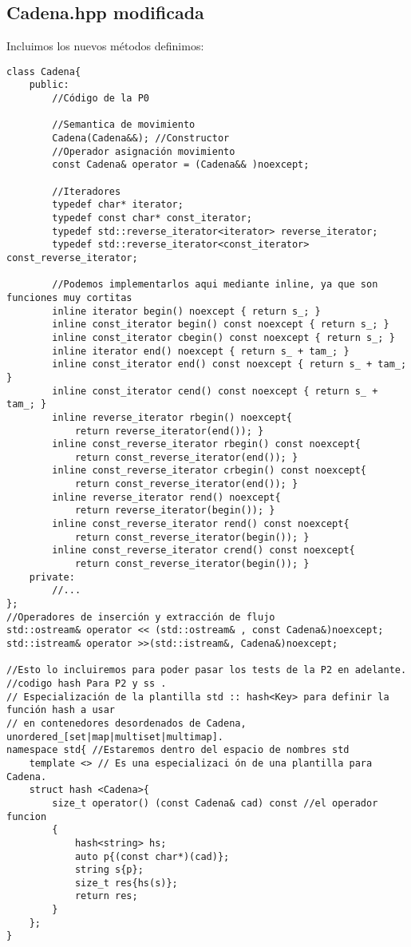 \subsection{Cadena.hpp modificada}
Incluimos los nuevos métodos definimos:
\begin{verbatim}
class Cadena{
    public:
        //Código de la P0

        //Semantica de movimiento
        Cadena(Cadena&&); //Constructor
        //Operador asignación movimiento
        const Cadena& operator = (Cadena&& )noexcept; 

        //Iteradores
        typedef char* iterator;
        typedef const char* const_iterator;
        typedef std::reverse_iterator<iterator> reverse_iterator;
        typedef std::reverse_iterator<const_iterator> const_reverse_iterator;

        //Podemos implementarlos aqui mediante inline, ya que son funciones muy cortitas
        inline iterator begin() noexcept { return s_; }
        inline const_iterator begin() const noexcept { return s_; }
        inline const_iterator cbegin() const noexcept { return s_; }
        inline iterator end() noexcept { return s_ + tam_; }
        inline const_iterator end() const noexcept { return s_ + tam_; }
        inline const_iterator cend() const noexcept { return s_ + tam_; }
        inline reverse_iterator rbegin() noexcept{
            return reverse_iterator(end()); }
        inline const_reverse_iterator rbegin() const noexcept{
            return const_reverse_iterator(end()); }
        inline const_reverse_iterator crbegin() const noexcept{
            return const_reverse_iterator(end()); }
        inline reverse_iterator rend() noexcept{
            return reverse_iterator(begin()); }
        inline const_reverse_iterator rend() const noexcept{
            return const_reverse_iterator(begin()); }
        inline const_reverse_iterator crend() const noexcept{
            return const_reverse_iterator(begin()); }
    private:
        //...
};
//Operadores de inserción y extracción de flujo
std::ostream& operator << (std::ostream& , const Cadena&)noexcept;
std::istream& operator >>(std::istream&, Cadena&)noexcept;

//Esto lo incluiremos para poder pasar los tests de la P2 en adelante.
//codigo hash Para P2 y ss .
// Especialización de la plantilla std :: hash<Key> para definir la función hash a usar
// en contenedores desordenados de Cadena, unordered_[set|map|multiset|multimap].
namespace std{ //Estaremos dentro del espacio de nombres std
    template <> // Es una especializaci ón de una plantilla para Cadena.
    struct hash <Cadena>{
        size_t operator() (const Cadena& cad) const //el operador funcion
        {
            hash<string> hs;
            auto p{(const char*)(cad)};
            string s{p};
            size_t res{hs(s)};
            return res;
        }
    };
}
\end{verbatim}

